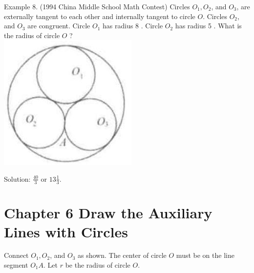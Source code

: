 \documentclass[10pt]{article}
\begin{document}
Example 8. (1994 China Middle School Math Contest) Circles \(O_{1}, O_{2}\), and \(O_{3}\), are externally tangent to each other and internally tangent to circle \(O\). Circles \(O_{2}\), and \(O_{3}\) are congruent. Circle \(O_{1}\) has radius 8 . Circle \(O_{2}\) has radius 5 . What is the radius of circle \(O\) ?\\
\includegraphics[max width=\textwidth, center]{2025_04_17_97bc1f7e44d93c271a88g-179}

Solution: \(\frac{40}{3}\) or \(13 \frac{1}{3}\).

\section*{Chapter 6 Draw the Auxiliary Lines with Circles}
Connect \(O_{1}, O_{2}\), and \(O_{3}\) as shown. The center of circle \(O\) must be on the line segment \(O_{1} A\). Let \(r\) be the radius of circle \(O\).
\end{document}
